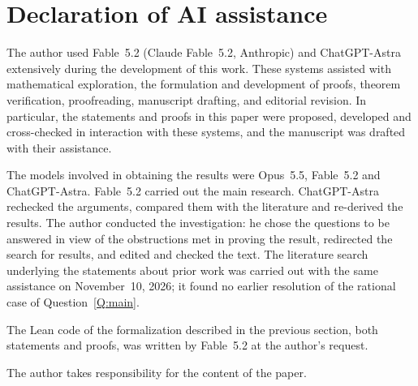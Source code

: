 \documentclass[11pt,reqno]{amsart}
\theoremstyle{plain}
\theoremstyle{definition}
\theoremstyle{remark}
\begin{document}
\section*{Declaration of AI assistance}

The author used Fable~5.2 (Claude Fable~5.2, Anthropic) and ChatGPT-Astra extensively during the development of this work. These systems assisted with mathematical exploration, the formulation and development of proofs, theorem verification, proofreading, manuscript drafting, and editorial revision. In particular, the statements and proofs in this paper were proposed, developed and cross-checked in interaction with these systems, and the manuscript was drafted with their assistance.

The models involved in obtaining the results were Opus~5.5, Fable~5.2 and ChatGPT-Astra. Fable~5.2 carried out the main research. ChatGPT-Astra rechecked the arguments, compared them with the literature and re-derived the results. The author conducted the investigation: he chose the questions to be answered in view of the obstructions met in proving the result, redirected the search for results, and edited and checked the text. The literature search underlying the statements about prior work was carried out with the same assistance on November~10, 2026; it found no earlier resolution of the rational case of Question~\ref{Q:main}.

The Lean code of the formalization described in the previous section, both statements and proofs, was written by Fable~5.2 at the author's request.

The author takes responsibility for the content of the paper.



\end{document}

